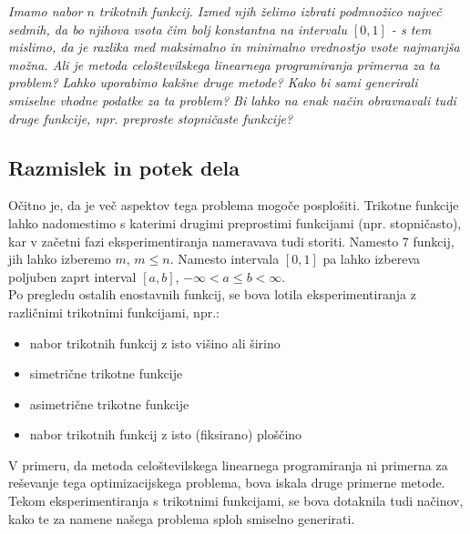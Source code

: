 \documentclass[11pt]{article}
\theoremstyle{definition}
\newcommand{\1}{\mathbbm{1}}
\begin{document}
\textit{Imamo nabor $n$ trikotnih funkcij. Izmed njih želimo izbrati podmnožico največ sedmih, da bo njihova vsota čim bolj konstantna na intervalu $[0,1]$ - s tem mislimo, da je razlika med maksimalno in minimalno vrednostjo vsote najmanjša možna. Ali je metoda celoštevilskega linearnega programiranja primerna za ta problem? Lahko uporabimo kakšne druge metode? Kako bi sami generirali smiselne vhodne podatke za ta problem? Bi lahko na enak način obravnavali tudi druge funkcije, npr. preproste stopničaste funkcije?}
\vspace{0.5cm}

\subsection{Razmislek in potek dela}
\vspace{0.5cm}

Očitno je, da je več aspektov tega problema mogoče posplošiti. Trikotne funkcije lahko nadomestimo s katerimi drugimi preprostimi funkcijami (npr. stopničasto), kar v začetni fazi eksperimentiranja nameravava tudi storiti. Namesto 7 funkcij, jih lahko izberemo $m$, $m \leq n$. Namesto intervala $[0,1]$ pa lahko izbereva poljuben zaprt interval $[a,b]$, $-\infty < a \leq b < \infty$. \\

\noindent Po pregledu ostalih enostavnih funkcij, se bova lotila eksperimentiranja z različnimi trikotnimi funkcijami, npr.:
\begin{itemize}
	\item nabor trikotnih funkcij z isto višino ali širino
	\item simetrične trikotne funkcije
	\item asimetrične trikotne funkcije
	\item nabor trikotnih funkcij z isto (fiksirano) ploščino
\end{itemize}
\vspace{0.5cm}

\noindent V primeru, da metoda celoštevilskega linearnega programiranja ni primerna za reševanje tega optimizacijskega problema, bova iskala druge primerne metode. Tekom eksperimentiranja s trikotnimi funkcijami, se bova dotaknila tudi načinov, kako te za namene našega problema sploh smiselno generirati. \\
\end{document}
